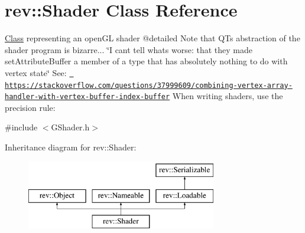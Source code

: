 \hypertarget{classrev_1_1_shader}{}\section{rev\+::Shader Class Reference}
\label{classrev_1_1_shader}


\mbox{\hyperlink{struct_class}{Class}} representing an open\+GL shader @detailed Note that QT\textquotesingle{}s abstraction of the shader program is bizarre... \char`\"{}\+I can\textquotesingle{}t tell what\textquotesingle{}s worse\+: 
that they made set\+Attribute\+Buffer a member of a type that has absolutely nothing to do with vertex state\char`\"{} See\+: \href{https://stackoverflow.com/questions/37999609/combining-vertex-array-handler-with-vertex-buffer-index-buffer}{\texttt{ https\+://stackoverflow.\+com/questions/37999609/combining-\/vertex-\/array-\/handler-\/with-\/vertex-\/buffer-\/index-\/buffer}} When writing shaders, use the precision rule\+:  




{\ttfamily \#include $<$G\+Shader.\+h$>$}

Inheritance diagram for rev\+::Shader\+:\begin{figure}[H]
\begin{center}
\leavevmode
\includegraphics[height=3.000000cm]{classrev_1_1_shader}
\end{center}
\end{figure}
